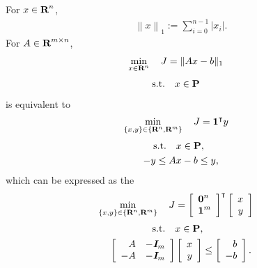 \documentclass{article}
\begin{document}
    For $x\in\textbf{R}^n$,
    \begin{align}
        \left\|x\right\|_1 := \sum_{i=0}^{n-1} |x_i|.
    \end{align}
    For $A\in\textbf{R}^{m\times n}$,
    \begin{align*}
        \min_{x\in\textbf{R}^n}\quad J&= \|Ax-b\|_1
    \end{align*}
    \begin{align*}
        \text{s.t.}\quad&x\in\textbf{P}
    \end{align*}
    is equivalent to 
    \cite[p.~294]{bv_cvxbook}
    \begin{align*}
        \min_{\{x,y\}\in\{\textbf{R}^n,\textbf{R}^m\}}
        \quad J &= \textbf{1}^\intercal y
    \end{align*}
    \begin{align*}
        \text{s.t.}\quad&x\in\textbf{P},\\ 
        -y \leq A&x-b \leq y,
    \end{align*}
    which can be expressed as the \LP
    \begin{align*}
        \min_{\{x,y\}\in\{\textbf{R}^n,\textbf{R}^m\}}
        \quad J &=  \left[\begin{array}{l}
                            \textbf{0}^{n}  \\   \textbf{1}^{m}
                        \end{array}\right]^\intercal
                        \left[\begin{array}{r}
                            x\\
                            y
                        \end{array}\right]
    \end{align*}
    \begin{align*}                
        \text{s.t.}\quad &x\in\textbf{P},\\
            \left[\begin{array}{rr}
                        A   &   -\emph{\textbf{I}} _m    \\
                        -A  &   -\emph{\textbf{I}} _m 
                    \end{array}\right]
                    &\left[\begin{array}{r}
                        x\\
                        y
                    \end{array}\right]
                \leq
                    \left[\begin{array}{r}
                        b\\
                        -b
                    \end{array}\right].
    \end{align*}
\end{document}
